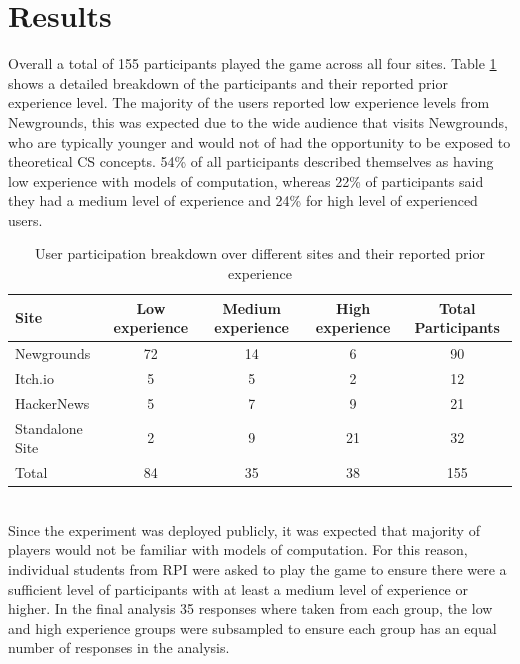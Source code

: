 \documentclass[letterpaper,man,natbib,floatsintext]{apa7}  %
\begin{document}
\section{Results}
Overall a total of 155 participants played the game across all four sites. Table \ref{tab:users} shows a detailed breakdown of the participants and their reported prior experience level. The majority of the users reported low experience levels from Newgrounds, this was expected due to the wide audience that visits Newgrounds, who are typically younger and would not of had the opportunity to be exposed to theoretical CS concepts. 54\% of all participants described themselves
as having low experience with models of computation, whereas 22\% of participants said they had a medium level of experience and 24\% for high level of experienced users. 
\begin{table}[h!]
	\caption{User participation breakdown over different sites and their reported prior experience}
	\label{tab:users}
	\begin{tabular}{l|ccc|c}
		\toprule
		Site & Low experience & Medium experience & High experience & Total Participants \\
		\midrule
		Newgrounds & 72 & 14 & 6 & 90\\
		Itch.io & 5 & 5 & 2 & 12\\
		HackerNews & 5 & 7 & 9 & 21\\
		Standalone Site & 2 & 9 & 21 & 32\\
		\midrule
		Total  & 84 & 35 & 38 & 155\\
		\bottomrule
	\end{tabular}
\end{table}\\
Since the experiment was deployed publicly, it was expected that 
majority of players would not be familiar with models of computation. For this reason, individual students from RPI were asked to play the game to ensure there were a sufficient level of participants with at least a medium level of experience or higher. In the final analysis 35 responses where taken from each group, the low and high experience groups were 
subsampled to ensure each group has an equal number of responses in the analysis. 
\end{document}

